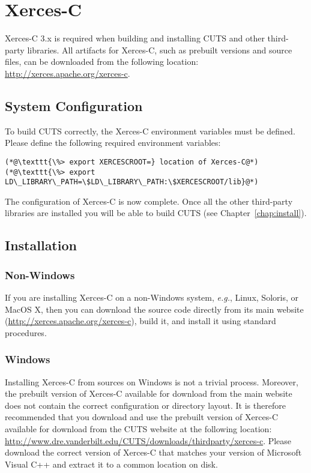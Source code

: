 \section{Xerces-C}
\label{sec:thirdparty-xercesc}

Xerces-C 3.x is required when building and installing CUTS and other third-party
libraries. All artifacts for Xerces-C, such as prebuilt versions and source files, 
can be downloaded from the following location: \url{http://xerces.apache.org/xerces-c}. 

\subsection{System Configuration}

To build CUTS correctly, the Xerces-C environment variables must be defined. Please 
define the following required environment variables:
\begin{lstlisting}
(*@\texttt{\%> export XERCESCROOT=} location of Xerces-C@*)
(*@\texttt{\%> export LD\_LIBRARY\_PATH=\$LD\_LIBRARY\_PATH:\$XERCESCROOT/lib}@*)
\end{lstlisting}
The configuration of Xerces-C is now complete. Once all the other
third-party libraries are installed you will be able to build CUTS
(see Chapter~\ref{chap:install}).

\subsection{Installation}

\subsubsection{Non-Windows}
 
If you are installing Xerces-C on a non-Windows system, \textit{e.g.}, Linux, 
Soloris, or MacOS X, then you can download the source code directly from its
main website (\url{http://xerces.apache.org/xerces-c}), build it, and install it using 
standard procedures.

\subsubsection{Windows}

Installing Xerces-C from sources on Windows is not a trivial process. 
Moreover, the prebuilt version of Xerces-C available for download from 
the main website does not contain the correct configuration or directory
layout. It is therefore recommended that you download and use the prebuilt 
version of Xerces-C available for download from the CUTS website at the 
following location:
\url{http://www.dre.vanderbilt.edu/CUTS/downloads/thirdparty/xerces-c}. Please download
the correct version of Xerces-C that matches your version of Microsoft Visual
C++ and extract it to a common location on disk.

